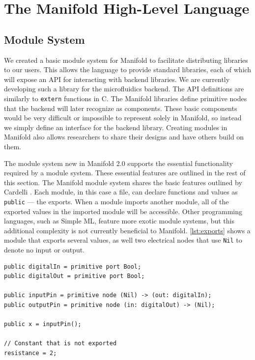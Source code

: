 \section{The Manifold High-Level Language}

\subsection{Module System}

We created a basic module system for Manifold to facilitate
distributing libraries to our users. This allows the language to provide standard
libraries, each of which will expose an API for interacting with backend
libraries. We are currently developing such a library for the microfluidics backend. The API definitions
are similarly to \texttt{extern} functions in C. The Manifold libraries
define primitive
nodes that the backend will later recognize as components. These basic
components would be very difficult or impossible to represent solely in Manifold,
so instead we simply define an interface for the backend library. Creating
modules in Manifold also allows researchers to share their designs and have
others build on them.

The module system new in Manifold 2.0 supports the essential functionality required by a module system. These
essential features are outlined in the rest of this section.
The Manifold module system shares the basic features outlined by Cardelli
\cite{Cardelli:1997:PFL:263699.263735}. Each module, in this case a file, can
declare functions and values as \texttt{public} --- the exports. When a module imports another
module, all of the exported values in the imported module will be
accessible. Other programming languages, such as Simple ML, feature more exotic module systems, but this
additional complexity is not currently beneficial to Manifold. \autoref{lst:exports} shows a module
that exports several values, as well two
electrical nodes that use \texttt{Nil} to denote no input or output.

\begin{lstlisting}[label=lst:exports, caption=Exported values in a Manifold file]
public digitalIn = primitive port Bool;
public digitalOut = primitive port Bool;

public inputPin = primitive node (Nil) -> (out: digitalIn);
public outputPin = primitive node (in: digitalOut) -> (Nil);

public x = inputPin();

// Constant that is not exported
resistance = 2;
\end{lstlisting}

